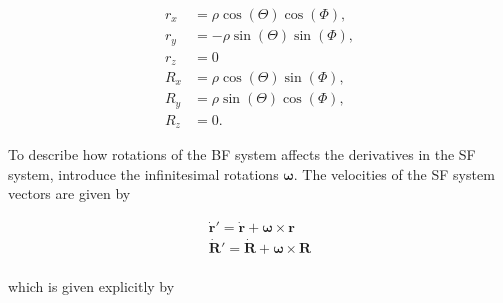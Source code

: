 \documentclass{article}
\begin{document}
\begin{subequations}
\begin{align*}
	r_x &= \rho \cos(\Theta)\cos(\Phi),\\
	r_y &= -\rho \sin(\Theta)\sin(\Phi),\\
	r_z &= 0\\
	R_x &= \rho \cos(\Theta)\sin(\Phi),\\
	R_y &= \rho \sin(\Theta)\cos(\Phi),\\
	R_z &= 0.
\end{align*}   
\end{subequations}

To describe how rotations of the BF system affects the derivatives in the SF system, introduce the infinitesimal rotations $\bm{\omega}$. The velocities of the SF system vectors are given by    

\begin{subequations}
	\begin{align*}
	 \dot{\bm{r}}' = \dot{\bm{r}} + \bm{\omega} \times \bm{r}\\
	 \dot{\bm{R}}' = \dot{\bm{R}} + \bm{\omega} \times \bm{R}\\
	\end{align*}   
\end{subequations} 

which is given explicitly by
\end{document}
